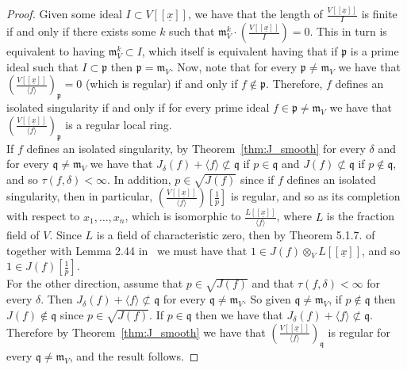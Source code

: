 \documentclass{article}
\newcommand{\maxV}{\mathfrak{m}_V}
\newcommand{\Vx}{V[[\underline{x}]]}
\numberwithin{theorem}{section}
\begin{document}
\begin{proof}
    Given some ideal $I \subset \Vx$, we have that the length of $\frac{\Vx}{I}$ is finite if and only if there exists some $k$ such that $\maxV^k \cdot \left(\frac{\Vx}{I}\right)=0$. This in turn is equivalent to having $\maxV^k \subset I$, which itself is equivalent having that if $\mathfrak{p}$ is a prime ideal such that $I \subset \mathfrak{p}$ then $\mathfrak{p}=\maxV$.
    Now, note that for every $\mathfrak{p} \neq \maxV$ we have that $\left(\frac{\Vx}{\langle f \rangle}\right)_\mathfrak{p} = 0$ (which is regular) if and only if $f \notin \mathfrak{p}$. Therefore,  $f$ defines an isolated singularity if and only if for every prime ideal $f \in \mathfrak{p} \neq \maxV$ we have that $\left(\frac{\Vx}{\langle f \rangle}\right)_\mathfrak{p}$ is a regular local ring.\\
    
    If $f$ defines an isolated singularity, by Theorem~\ref{thm:J_smooth}  for every $\delta$ and for every $\mathfrak{q} \neq \maxV$ we have that $J_\delta\left(f\right) + \langle f \rangle \not\subset \mathfrak{q}$ if $p \in \mathfrak{q}$ and $J\left(f\right) \not\subset \mathfrak{q}$ if $p \notin \mathfrak{q}$, and so $\tau(f, \delta) < \infty$. In addition, $p \in \sqrt{J\left(f\right)}$ since if $f$ defines an isolated singularity, then in particular, $\left(\frac{\Vx}{\langle f \rangle}\right)[\frac{1}{p}]$ is regular, and so as its completion with respect to $x_1, \dots, x_n$, which is isomorphic to $\frac{L[[\underline{x}]]}{\langle f \rangle}$, where $L$ is the fraction field of $V$. Since $L$ is a field of characteristic zero, then by Theorem 5.1.7. of~\cite{boubakri2009hypersurface} together with Lemma 2.44 in~\cite{greuel2007introduction} we must have that $1 \in J\left(f\right) \otimes_V L[[\underline{x}]]$, and so  $1 \in J\left(f\right)[\frac{1}{p}]$.\\
    
    For the other direction, assume that $p \in \sqrt{J\left(f\right)}$ and that $\tau(f, \delta) < \infty$ for every $\delta$. Then $J_\delta\left(f\right) + \langle f \rangle \not\subset \mathfrak{q}$ for every $\mathfrak{q} \neq \maxV$. So given $\mathfrak{q} \neq \maxV$, if $p \notin \mathfrak{q}$ then $J\left(f\right) \notin \mathfrak{q}$ since $p \in\sqrt{J\left(f\right)}$. If $p \in \mathfrak{q}$ then we have that $J_\delta\left(f\right) + \langle f \rangle \not\subset \mathfrak{q}$. Therefore by Theorem~\ref{thm:J_smooth} we have that $\left(\frac{\Vx}{\langle f \rangle}\right)_\mathfrak{q}$ is regular for every $\mathfrak{q} \neq \maxV$, and the result follows. 
\end{proof}
\end{document}
